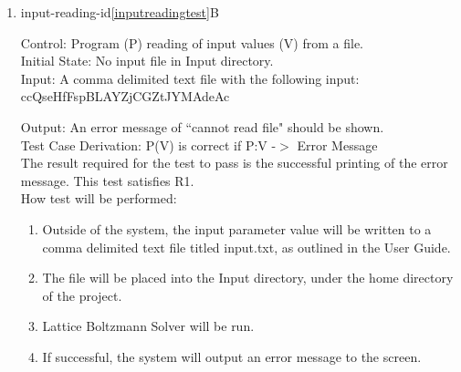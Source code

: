 \documentclass[12pt, titlepage]{article}
\newcommand{\famname}{Lattice Boltzmann Solver}
\begin{document}
\begin{enumerate}
Test Case Derivation: P(V) is correct if P:V -$>$ O and O = V\\

The result required for the test to pass is the successful printing of all input
values to the screen. This test satisfies R1.\\
					
How test will be performed: 

\begin{enumerate}
\item Outside of the system, the input parameter values will be written to a
  comma delimited text file titled input.txt, as outlined in the User Guide.
\item The file will be placed into the Input directory, under the home directory
  of the project.
\item {\famname} will be run.
\item If successful, The system will output the input parameters to the screen.
\end{enumerate}

\item{input-reading-id\ref{inputreadingtest}B\\}

Control: Program (P) reading of input values (V) from a file.\\

Initial State: No input file in Input directory.\\

Input: A comma delimited text file with the following input:\\
ccQseHfFspBLAYZjCGZtJYMAdeAc

Output: An error message of ``cannot read file" should be shown.\\

Test Case Derivation: P(V) is correct if P:V -$>$ Error Message \\

The result required for the test to pass is the successful printing of the error message. This test satisfies R1.\\

How test will be performed: 

\begin{enumerate}
\item Outside of the system, the input parameter value will be written to a
  comma delimited text file titled input.txt, as outlined in the User Guide.
\item The file will be placed into the Input directory, under the home directory
  of the project.
\item {\famname} will be run.
\item If successful, the system will output an error message to the screen.
\end{enumerate}

\end{enumerate}
			
\end{document}

